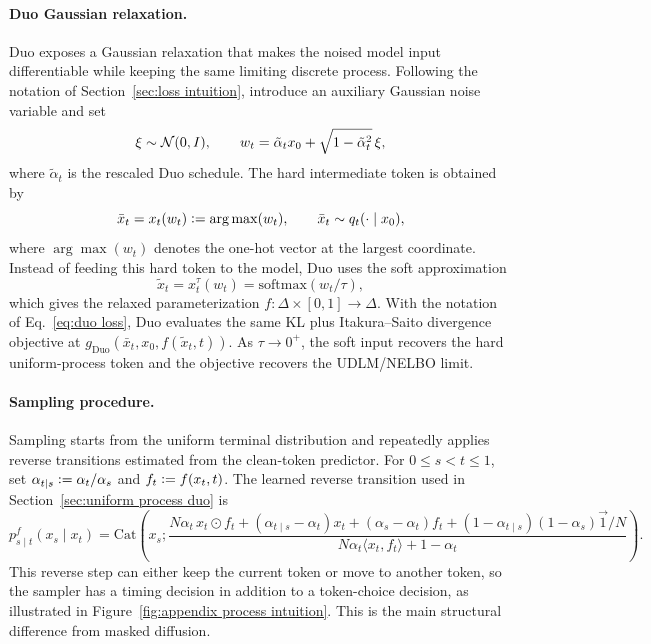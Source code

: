 \begin{reviewblock}
\paragraph{Duo Gaussian relaxation.}
Duo exposes a Gaussian relaxation that makes the noised model input differentiable while keeping the same limiting discrete process. Following the notation of Section~\ref{sec:loss intuition}, introduce an auxiliary Gaussian noise variable and set
\[
    \xi\sim\mathcal{N}(0,I),
    \qquad
    w_t=\tilde{\alpha}_t x_0+\sqrt{1-\tilde{\alpha}_t^2}\,\xi,
\]
where $\tilde{\alpha}_t$ is the rescaled Duo schedule. The hard intermediate token is obtained by
\[
    \bar{x}_t=x_t(w_t) \vcentcolon= \arg\max(w_t),
    \qquad
    \bar{x}_t\sim q_t(\cdot\mid x_0),
\]
where $\arg\max(w_t)$ denotes the one-hot vector at the largest coordinate. Instead of feeding this hard token to the model, Duo uses the soft approximation
\[
    \tilde{x}_t=x_t^\tau(w_t) = \mathrm{softmax}(w_t/\tau),
\]
which gives the relaxed parameterization $f\colon\Delta\times[0,1]\to\Delta$. With the notation of Eq.~\eqref{eq:duo loss}, Duo evaluates the same KL plus Itakura--Saito divergence objective at $g_{\mathrm{Duo}}(\bar{x}_t,x_0,f(\tilde{x}_t,t))$. As $\tau\to0^+$, the soft input recovers the hard uniform-process token and the objective recovers the UDLM/NELBO limit.

\paragraph{Sampling procedure.}
Sampling starts from the uniform terminal distribution and repeatedly applies reverse transitions estimated from the clean-token predictor. For $0\leq s<t\leq1$, set $\alpha_{t\mid s}\vcentcolon=\alpha_t/\alpha_s$ and $f_t\vcentcolon=f(x_t,t)$. The learned reverse transition used in Section~\ref{sec:uniform process duo} is
\[
p^f_{s\mid t}(x_s\mid x_t)
=
\mathrm{Cat}\!\left(x_s;\frac{N\alpha_t\,x_t\odot f_t+(\alpha_{t\mid s}-\alpha_t)x_t+(\alpha_s-\alpha_t)f_t+(1-\alpha_{t\mid s})(1-\alpha_s)\vec{1}/N}{N\alpha_t\langle x_t,f_t\rangle+1-\alpha_t}\right).
\]
This reverse step can either keep the current token or move to another token, so the sampler has a timing decision in addition to a token-choice decision, as illustrated in Figure~\ref{fig:appendix process intuition}. This is the main structural difference from masked diffusion.


\end{reviewblock}
